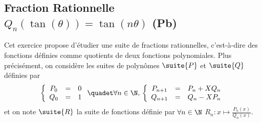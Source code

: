 \subsection{Fraction Rationnelle $Q_n(\tan(\theta)) = \tan(n\theta)$ (Pb) }
\begin{exercice}
Cet exercice propose d'étudier une suite de fractions rationnelles, c'est-à-dire des fonctions définies comme quotients de deux fonctions polynomiales. Plus précisément, on considère les suites de polynômes $\suite{P}$ et $\suite{Q}$ définies par 
$$
\left\{\begin{array}{ccc}
P_0 &=& 0\\
Q_0 &=& 1
\end{array}
 \right. \quadet \forall n\in \N, \, 
\left\{\begin{array}{ccc}
P_{n+1} &=& P_n + X Q_n\\
Q_{n+1} &=& Q_n -XP_n
\end{array}
 \right. 
$$
et on note $\suite{R}$ la suite de fonctions définie par $\forall n\in \N$ 
$R_n : x\mapsto\frac{P_n(x)}{Q_n(x)}.$


\end{exercice}
